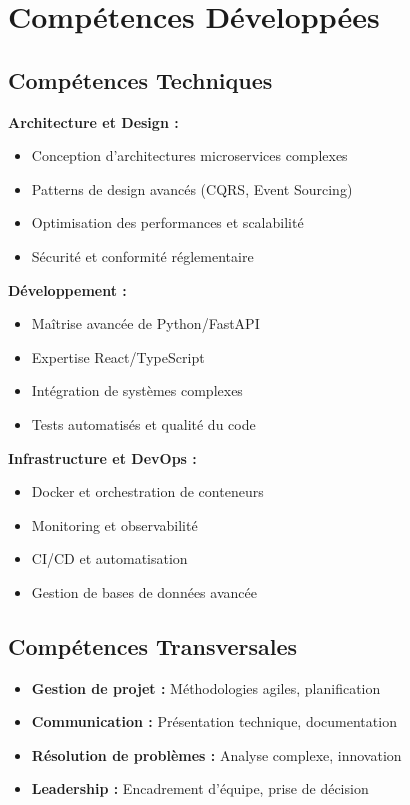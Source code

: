 \documentclass[a4paper,12pt]{article}
\begin{document}
\section*{Compétences Développées}

\subsection*{Compétences Techniques}

\textbf{Architecture et Design :}
\begin{itemize}
    \item Conception d'architectures microservices complexes
    \item Patterns de design avancés (CQRS, Event Sourcing)
    \item Optimisation des performances et scalabilité
    \item Sécurité et conformité réglementaire
\end{itemize}

\textbf{Développement :}
\begin{itemize}
    \item Maîtrise avancée de Python/FastAPI
    \item Expertise React/TypeScript
    \item Intégration de systèmes complexes
    \item Tests automatisés et qualité du code
\end{itemize}

\textbf{Infrastructure et DevOps :}
\begin{itemize}
    \item Docker et orchestration de conteneurs
    \item Monitoring et observabilité
    \item CI/CD et automatisation
    \item Gestion de bases de données avancée
\end{itemize}

\subsection*{Compétences Transversales}

\begin{itemize}
    \item \textbf{Gestion de projet :} Méthodologies agiles, planification
    \item \textbf{Communication :} Présentation technique, documentation
    \item \textbf{Résolution de problèmes :} Analyse complexe, innovation
    \item \textbf{Leadership :} Encadrement d'équipe, prise de décision
\end{itemize}
\end{document}
